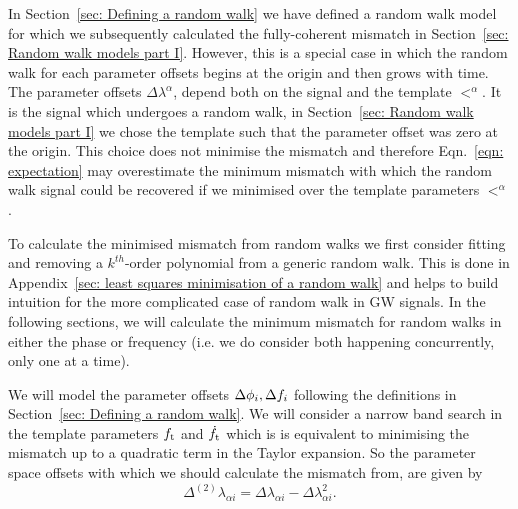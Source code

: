 
In Section~\ref{sec: Defining a random walk} we have defined a random walk model
for which we subsequently calculated the fully-coherent mismatch in
Section~\ref{sec: Random walk models part I}. However, this is a special case in
which the random walk for each parameter offsets begins at the origin and then
grows with time. The parameter offsets $\Delta\lambda^{\alpha}$, depend both on
the signal and the template $\lt^{\alpha}$. It is the signal which undergoes a random walk, in Section~\ref{sec:
Random walk models part I} we chose the template such that the parameter offset
was zero at the origin. This choice does not minimise the mismatch and therefore
Eqn.~\eqref{eqn: expectation} may overestimate the minimum mismatch
with which the random walk signal could be recovered if we minimised over the
template parameters $\lt^{\alpha}$.

To calculate the minimised mismatch from random walks we first consider
fitting and removing a $k^{th}$-order polynomial from a generic random walk. This
is done in Appendix~\ref{sec: least squares minimisation of a random walk} and
helps to build intuition for the more complicated case of random walk in
GW signals. In the following sections, we will calculate the minimum
mismatch for random walks in either the phase or frequency (i.e. we do
consider both happening concurrently, only one at a time).

We will model the parameter offsets $\Delta\phi_{i}, \Delta f_{i}$
following the definitions in Section~\ref{sec: Defining a random walk}.
We will consider a narrow band search in the template parameters
$f_\textrm{t}$ and $\dot{f}_\textrm{t}$ which is
is equivalent to minimising the mismatch up to a quadratic term in the Taylor
expansion. So the parameter space offsets with which we should calculate the
mismatch from, are given by
\begin{equation}
\Delta^{(2)}\lambda_{\alpha i} = \Delta\lambda_{\alpha i} - \Delta\lambda_{\alpha i}^{2}.
\end{equation}

